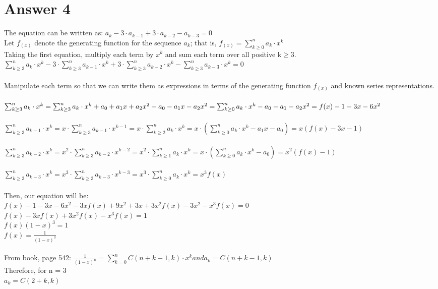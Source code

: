 \documentclass[11pt]{article}
\begin{document}
\section*{Answer 4}
The equation can be written as: $a_k - 3\cdot a_{k-1}+3\cdot a_{k-2}-a_{k-3} = 0$\\
Let $f_{(x)}$ denote the generating function for the sequence $a_k$; that is, $f_{(x)}=\sum_{k\geq0}^na_k\cdot x^k$\\
Taking the first equation, multiply each term by $x^k$ and sum each term over all positive k$\geq$3. \\
$\sum_{k\geq3}^na_k\cdot x^k - 3\cdot\sum_{k\geq3}^na_{k-1}\cdot x^k + 3\cdot\sum_{k\geq3}^na_{k-2}\cdot x^k - \sum_{k\geq3}^na_{k-3}\cdot x^k = 0$\\\\
Manipulate each term so that we can write them as expressions in terms of the generating function $f_{(x)}$ and known series representations. \\\\
$\sum_{k\geq3}^na_k\cdot x^k = \sum_{k\geq3}^na_k\cdot x^k + a_0 + a_1x + a_2x^2 - a_0 - a_1x - a_2x^2 = \sum_{k\geq0}^na_k\cdot x^k - a_0 - a_1 - a_2x^2 \\= f(x) - 1 - 3x - 6x^2$\\\\
$\sum_{k\geq3}^na_{k-1}\cdot x^{k} = x\cdot\sum_{k\geq3}^na_{k-1}\cdot x^{k-1} = x\cdot\sum_{k\geq2}^na_k\cdot x^k = x\cdot(\sum_{k\geq0}^na_k\cdot x^k - a_1x - a_0) = x(f(x) - 3x - 1)$\\\\
$\sum_{k\geq3}^na_{k-2}\cdot x^{k} = x^2\cdot\sum_{k\geq3}^na_{k-2}\cdot x^{k-2} = x^2\cdot\sum_{k\geq1}^na_k\cdot x^k = x\cdot(\sum_{k\geq0}^na_k\cdot x^k - a_0) = x^2(f(x) - 1)$\\\\
$\sum_{k\geq3}^na_{k-3}\cdot x^{k} = x^3\cdot\sum_{k\geq3}^na_{k-3}\cdot x^{k-3} = x^3\cdot\sum_{k\geq0}^na_k\cdot x^k = x^3f(x)$\\\\
Then, our equation will be:\\
$f(x)-1-3x-6x^2-3xf(x)+9x^2+3x+3x^2f(x)-3x^2-x^3f(x) = 0$\\
$f(x)-3xf(x)+3x^2f(x)-x^3f(x) = 1$\\
$f(x)(1-x)^3 = 1$\\
$f(x) = \frac{1}{(1-x)^3}$\\\\
From book, page 542: $\frac{1}{(1-x)^n} = \sum_{k=0}^nC(n+k-1,k)\cdot x^{k} and a_k = C(n+k-1,k)$\\
Therefore, for n = 3\\ $a_k = C(2+k, k)$
\newpage
\end{document}

